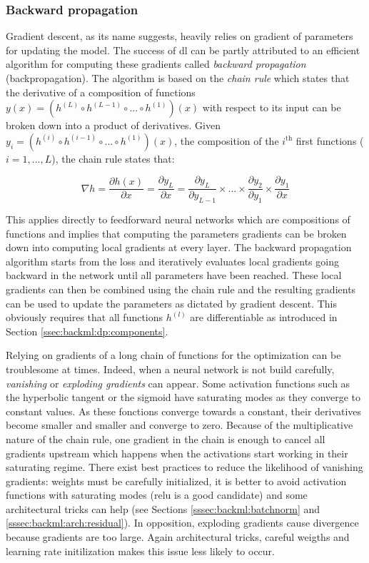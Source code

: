 \subsubsection{Backward propagation}
\label{sssec:backml:backprop}

Gradient descent, as its name suggests, heavily relies on gradient of parameters
for updating the model. The success of \acrlong{dl} can be partly attributed to
an efficient algorithm for computing these gradients called \textit{backward propagation}
\cite{rumelhart1986learning} (\aka backpropagation). The algorithm is based
on the \textit{chain rule} which states that the derivative of a composition of
functions $y(x) = (h^{(L)} \circ h^{(L-1)} \circ ... \circ h^{(1)})(x)$ with respect
to its input can be broken down into a product of derivatives. Given
$y_i = (h^{(i)} \circ h^{(i-1)} \circ ... \circ h^{(1)})(x)$, the composition of
the $i^{\text{th}}$ first functions ($i = 1, ..., L$), the chain rule states
that:

\begin{equation}
\label{eqn:backml:chainrule}
\nabla h = \dfrac{\partial h(x)}{\partial x} = \dfrac{\partial y_L}{\partial x} = \dfrac{\partial y_L}{\partial y_{L-1}} \times ... \times \dfrac{\partial y_2}{\partial y_1} \times \dfrac{\partial y_1}{\partial x}
\end{equation}

This applies directly to feedforward neural networks which are compositions of
functions and implies that computing the parameters gradients can be broken down
into computing local gradients at every layer. The backward propagation algorithm
starts from the loss and iteratively evaluates local gradients going backward in
the network until all parameters have been reached. These local gradients can then
be combined using the chain rule and the resulting gradients can be used to update
the parameters as dictated by gradient descent. This obviously requires that all
functions $h^{(l)}$ are differentiable as introduced in Section
\ref{ssec:backml:dp:components}.

Relying on gradients of a long chain of functions for the optimization can be
troublesome at times. Indeed, when a neural network is not build carefully,
\textit{vanishing} or \textit{exploding gradients} can appear. Some activation
functions such as the hyperbolic tangent or the sigmoid have saturating modes as
they converge to constant values. As these fonctions converge towards a constant,
their derivatives become smaller and smaller and converge to zero. Because of the
multiplicative nature of the chain rule, one gradient in the chain is enough to
cancel all gradients upstream which happens when the activations start working in
their saturating regime. There exist best practices to reduce the likelihood of
vanishing gradients: weights must be carefully initialized, it is better to avoid
activation functions with saturating modes (\acrshort{relu} is a good candidate)
and some architectural tricks can help (see Sections \ref{sssec:backml:batchnorm}
and \ref{sssec:backml:arch:residual}). In opposition, exploding gradients cause
divergence because gradients are too large. Again architectural tricks, careful
weigths and learning rate initilization makes this issue less likely to occur.

